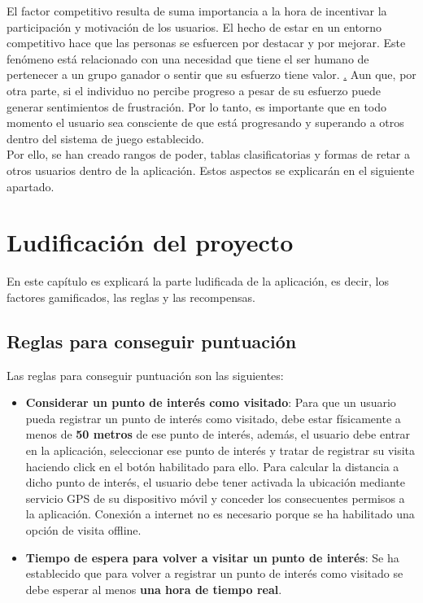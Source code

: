\documentclass{report}
\begin{document}
El factor competitivo resulta de suma importancia a la hora de incentivar la participación y motivación de los usuarios. El hecho de estar en un entorno competitivo hace que las personas se esfuercen por destacar y por mejorar. Este fenómeno está relacionado con una necesidad que tiene el ser humano de pertenecer a un grupo ganador o sentir que su esfuerzo tiene valor.
\href{https://www.areahumana.es/personalidad-competitiva/}. Aun que, por otra parte, si el individuo no percibe progreso a pesar de su esfuerzo puede generar sentimientos de frustración. Por lo tanto, es importante que en todo momento el usuario sea consciente de que está progresando y superando a otros dentro del sistema de juego establecido.\\
Por ello, se han creado rangos de poder, tablas clasificatorias y formas de retar a otros usuarios dentro de la aplicación. Estos aspectos se explicarán en el siguiente apartado.\\

\chapter{Ludificación del proyecto}
En este capítulo es explicará la parte ludificada de la aplicación, es decir, los factores gamificados, las reglas y las recompensas.
\section{Reglas para conseguir puntuación}
Las reglas para conseguir puntuación son las siguientes:
\begin{itemize}
\item \textbf{Considerar un punto de interés como visitado}: Para que un usuario pueda registrar un punto de interés como visitado, debe estar físicamente a menos de \textbf{50 metros} de ese punto de interés, además, el usuario debe entrar en la aplicación, seleccionar ese punto de interés y tratar de registrar su visita haciendo click en el botón habilitado para ello. Para calcular la distancia a dicho punto de interés, el usuario debe tener activada la ubicación mediante servicio GPS de su dispositivo móvil y conceder los consecuentes permisos a la aplicación. Conexión a internet no es necesario porque se ha habilitado una opción de visita offline.
\item \textbf{Tiempo de espera para volver a visitar un punto de interés}: Se ha establecido que para volver a registrar un punto de interés como visitado se debe esperar al menos \textbf{una hora de tiempo real}. 
\end{itemize}
\end{document}
